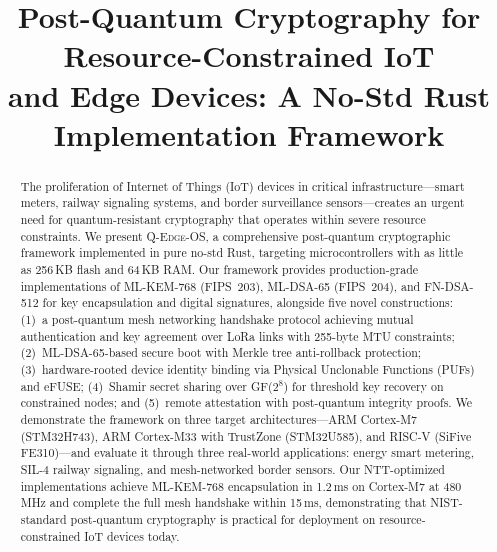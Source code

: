 \documentclass[conference,10pt]{IEEEtran}
\newcommand{\system}{\textsc{Q-Edge-OS}}
\begin{document}
\title{Post-Quantum Cryptography for Resource-Constrained IoT\\and Edge Devices: A No-Std Rust Implementation Framework}

\author{
}

\maketitle

\begin{abstract}
The proliferation of Internet of Things (IoT) devices in critical infrastructure---smart meters, railway signaling systems, and border surveillance sensors---creates an urgent need for quantum-resistant cryptography that operates within severe resource constraints. We present \system{}, a comprehensive post-quantum cryptographic framework implemented in pure no-std Rust, targeting microcontrollers with as little as 256\,KB flash and 64\,KB RAM. Our framework provides production-grade implementations of ML-KEM-768 (FIPS~203), ML-DSA-65 (FIPS~204), and FN-DSA-512 for key encapsulation and digital signatures, alongside five novel constructions: (1)~a post-quantum mesh networking handshake protocol achieving mutual authentication and key agreement over LoRa links with 255-byte MTU constraints; (2)~ML-DSA-65-based secure boot with Merkle tree anti-rollback protection; (3)~hardware-rooted device identity binding via Physical Unclonable Functions (PUFs) and eFUSE; (4)~Shamir secret sharing over GF($2^8$) for threshold key recovery on constrained nodes; and (5)~remote attestation with post-quantum integrity proofs. We demonstrate the framework on three target architectures---ARM Cortex-M7 (STM32H743), ARM Cortex-M33 with TrustZone (STM32U585), and RISC-V (SiFive FE310)---and evaluate it through three real-world applications: energy smart metering, SIL-4 railway signaling, and mesh-networked border sensors. Our NTT-optimized implementations achieve ML-KEM-768 encapsulation in 1.2\,ms on Cortex-M7 at 480\,MHz and complete the full mesh handshake within 15\,ms, demonstrating that NIST-standard post-quantum cryptography is practical for deployment on resource-constrained IoT devices today.
\end{abstract}
\end{document}
